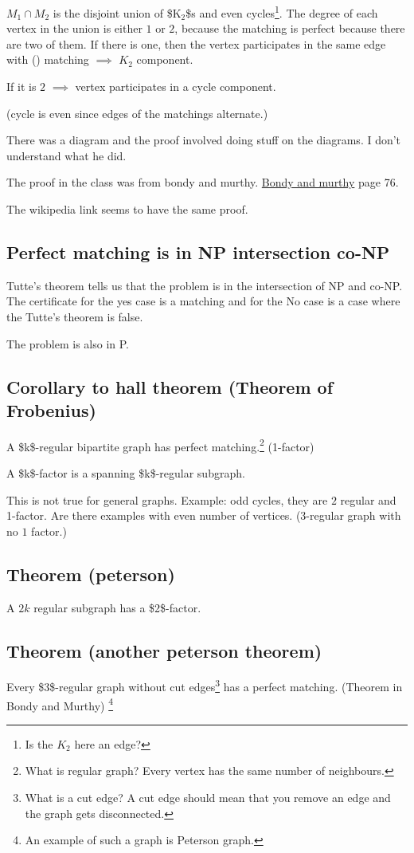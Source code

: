 \documentclass[11pt]{article}
\begin{document}
\(M_1 \cap M_2\) is the disjoint union of \$K\(_{\text{2}}\)\$s and even cycles\footnote{Is the \(K_2\) here an edge?}. The degree
of each vertex in the union is either \(1\) or \(2\), because the matching is
perfect because there are two of them. If there is one, then the vertex
participates in the same edge with () matching \(\implies\) \(K_2\) component.

If it is \(2\) \(\implies\) vertex participates in a cycle component.

(cycle is even since edges of the matchings alternate.)

There was a diagram and the proof involved doing stuff on the diagrams. I
don't understand what he did.

The proof in the class was from bondy and murthy. \href{http://www.zib.de/groetschel/teaching/WS1314/BondyMurtyGTWA.pdf}{Bondy and murthy} page 76. 

The wikipedia link seems to have the same proof.
\subsection{Perfect matching is in NP intersection co-NP}
\label{sec:org3370d54}
Tutte's theorem tells us that the problem is in the intersection of NP and
co-NP. The certificate for the yes case is a matching and for the No case is
a case where the Tutte's theorem is false.

The problem is also in P.
\subsection{Corollary to hall theorem (Theorem of Frobenius)}
\label{sec:orga98947b}
A \$k\$-regular bipartite graph has perfect matching.\footnote{What is regular graph? Every vertex has the same number of neighbours.} (1-factor)

A \$k\$-factor is a spanning \$k\$-regular subgraph. 

This is not true for general graphs. Example: odd cycles, they are \(2\)
regular and 1-factor. Are there examples with even number of vertices.
(3-regular graph with no \(1\) factor.)


\subsection{Theorem (peterson)}
\label{sec:org22cf109}
A \(2k\) regular subgraph has a \$2\$-factor. 
\subsection{Theorem (another peterson theorem)}
\label{sec:org2e2df4d}
Every \$3\$-regular graph without cut edges\footnote{What is a cut edge? A cut edge should mean that you remove an edge and
the graph gets disconnected.} has a perfect matching. (Theorem in
Bondy and Murthy) \footnote{An example of such a graph is Peterson graph.}
\end{document}
